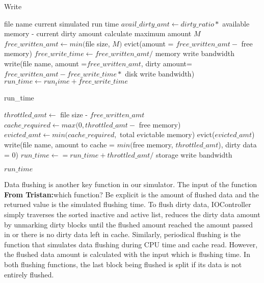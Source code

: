 \documentclass[conference]{IEEEtran}
\newcommand{\Desc}[2]{\State \makebox[5em][l]{#1}#2}
\newcommand{\tristan}[1]{\color{orange}\textbf{From Tristan:}#1\color{black}}
\begin{document}
			\begin{algorithm}\caption{Write}\label{alg:write}
				\small
				\begin{algorithmic}[1]
					\Input
        				\Desc{$file\_name$}{file name}
			        	\Desc{$run\_time$}{current simulated run time}
   					\EndInput
					\State $avail\_dirty\_amt \gets dirty\_ratio *$ available memory - current dirty amount
   						\State calculate maximum amount $M$
   						\State $free\_written\_amt \gets min($file size, $M)$
    						\State evict(amount = $free\_written\_amt -$ free memory)
    					\EndIf
    					\State $free\_write\_time \gets free\_written\_amt /$ memory write bandwidth
    					\State write(file name, amount =$free\_written\_amt$, dirty amount=$free\_written\_amt - free\_write\_time *$ disk write bandwidth)
   						\State $run\_time \gets run_time +free\_write\_time$
    				\EndIf
					
						\Return run\_time
					\EndIf

					\State $throttled\_amt \gets $ file size - $free\_written\_amt$
					\State $cache\_required \gets max(0, throttled\_amt  -$ free memory)
					\State $evicted\_amt \gets min(cache\_required,$ total evictable memory)
						\State  evict($evicted\_amt$)
					\EndIf
					\State write(file name, amount to cache = $min($free memory, $throttled\_amt$), dirty data = 0)
					\State $run\_time \gets = run\_time + throttled\_amt /$ storage write bandwidth

					\Return $run{\_}time$
					
				\end{algorithmic}
			\end{algorithm}	
			
			Data flushing is another key function in our simulator. The input of the function \tristan{which function? Be explicit} is the amount of flushed data and the returned value is the simulated flushing time. To flush dirty data, IOController simply traverses the sorted inactive and active list, reduces the dirty data amount by unmarking dirty blocks until the flushed amount reached the amount passed in or there is no dirty data left in cache. Similarly, periodical flushing is the function that simulates data flushing during CPU time and cache read. However, the flushed data amount is calculated with the input which is flushing time. In both flushing functions, the last block being flushed is split if its data is not entirely flushed.			
				
\end{document}
